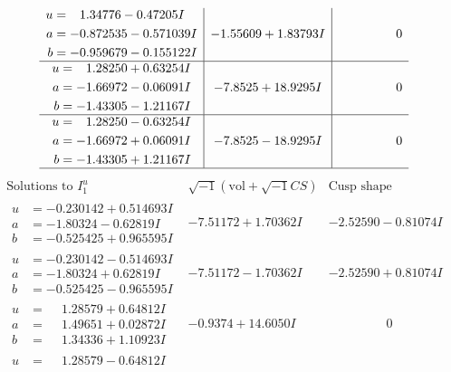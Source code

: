 \documentclass[1p]{elsarticle_modified}
\theoremstyle{definition}
\newcommand{\I}{\sqrt{-1}}
\begin{document}
$$\begin{array}{c|c|c}
\begin{aligned}
u &= \phantom{-}1.34776 - 0.47205 I \\
a &= -0.872535 - 0.571039 I \\
b &= -0.959679 - 0.155122 I\end{aligned}
 & -1.55609 + 1.83793 I & \phantom{-0.000000 } 0 \\ \hline\begin{aligned}
u &= \phantom{-}1.28250 + 0.63254 I \\
a &= -1.66972 - 0.06091 I \\
b &= -1.43305 - 1.21167 I\end{aligned}
 & -7.8525 + 18.9295 I & \phantom{-0.000000 } 0 \\ \hline\begin{aligned}
u &= \phantom{-}1.28250 - 0.63254 I \\
a &= -1.66972 + 0.06091 I \\
b &= -1.43305 + 1.21167 I\end{aligned}
 & -7.8525 - 18.9295 I & \phantom{-0.000000 } 0\\
 \hline 
 \end{array}$$\newpage$$\begin{array}{c|c|c}  
\text{Solutions to }I^u_{1}& \I (\text{vol} + \sqrt{-1}CS) & \text{Cusp shape}\\
 \hline 
\begin{aligned}
u &= -0.230142 + 0.514693 I \\
a &= -1.80324 - 0.62819 I \\
b &= -0.525425 + 0.965595 I\end{aligned}
 & -7.51172 + 1.70362 I & -2.52590 - 0.81074 I \\ \hline\begin{aligned}
u &= -0.230142 - 0.514693 I \\
a &= -1.80324 + 0.62819 I \\
b &= -0.525425 - 0.965595 I\end{aligned}
 & -7.51172 - 1.70362 I & -2.52590 + 0.81074 I \\ \hline\begin{aligned}
u &= \phantom{-}1.28579 + 0.64812 I \\
a &= \phantom{-}1.49651 + 0.02872 I \\
b &= \phantom{-}1.34336 + 1.10923 I\end{aligned}
 & -0.9374 + 14.6050 I & \phantom{-0.000000 } 0 \\ \hline\begin{aligned}
u &= \phantom{-}1.28579 - 0.64812 I \\

\end{aligned}
\end{array}$$
\end{document}
